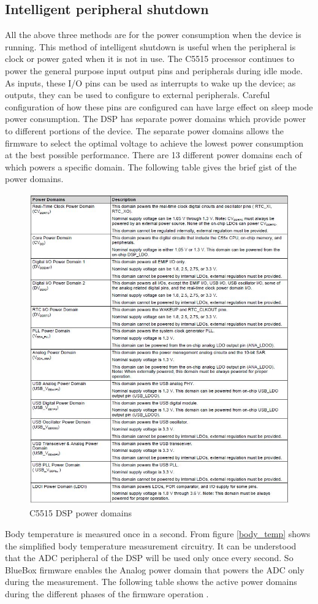 \subsection{Intelligent peripheral shutdown}
All the above three methods are for the power consumption when the device is running. This method of intelligent shutdown is useful when the peripheral is clock or power gated when it is not in use. The C5515 processor continues to power the general purpose input output pins and peripherals during idle mode. As inputs, these I/O pins can be used as interrupts to wake 
up the device; as outputs, they can be used to configure to external peripherals. Careful configuration of how these pins are configured can have large effect on sleep mode power consumption. 
The DSP has separate power domains which provide power to different portions of the device. The separate power domains allows the firmware to select the optimal voltage to achieve the lowest power consumption at the best possible performance. There are 13 different power domains each of which powers a specific domain. The following table gives the brief gist of the power domains.
\begin{figure}[h]
	\centering
	\includegraphics[scale = 1 ]{power_domain.JPG}
	\caption{C5515 DSP power domains\label{power_domain}}
\end{figure}
Body temperature is measured once in a second. From figure \ref{body_temp} shows the simplified body temperature measurement circuitry. It can be understood that the ADC peripheral of the DSP will be used only once every second. So BlueBox firmware enables the Analog power domain that powers the ADC only during the measurement. The following table shows the active power domains during the different phases of the firmware operation .

